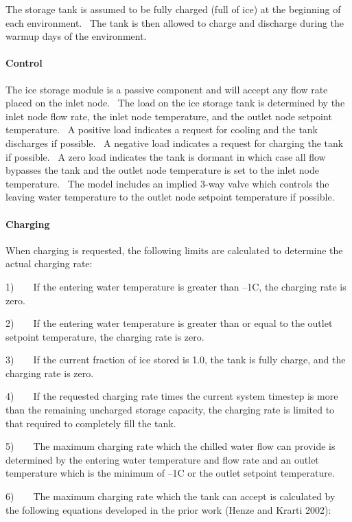 The storage tank is assumed to be fully charged (full of ice) at the beginning of each environment.~ The tank is then allowed to charge and discharge during the warmup days of the environment.

\paragraph{Control}\label{control-000}

The ice storage module is a passive component and will accept any flow rate placed on the inlet node.~ The load on the ice storage tank is determined by the inlet node flow rate, the inlet node temperature, and the outlet node setpoint temperature.~ A positive load indicates a request for cooling and the tank discharges if possible.~ A negative load indicates a request for charging the tank if possible.~ A zero load indicates the tank is dormant in which case all flow bypasses the tank and the outlet node temperature is set to the inlet node temperature.~ The model includes an implied 3-way valve which controls the leaving water temperature to the outlet node setpoint temperature if possible.

\paragraph{Charging}\label{charging}

When charging is requested, the following limits are calculated to determine the actual charging rate:

1)~~~~If the entering water temperature is greater than --1C, the charging rate is zero.

2)~~~~If the entering water temperature is greater than or equal to the outlet setpoint temperature, the charging rate is zero.

3)~~~~If the current fraction of ice stored is 1.0, the tank is fully charge, and the charging rate is zero.

4)~~~~If the requested charging rate times the current system timestep is more than the remaining uncharged storage capacity, the charging rate is limited to that required to completely fill the tank.

5)~~~~The maximum charging rate which the chilled water flow can provide is determined by the entering water temperature and flow rate and an outlet temperature which is the minimum of --1C or the outlet setpoint temperature.

6)~~~~The maximum charging rate which the tank can accept is calculated by the following equations developed in the prior work (Henze and Krarti 2002):

